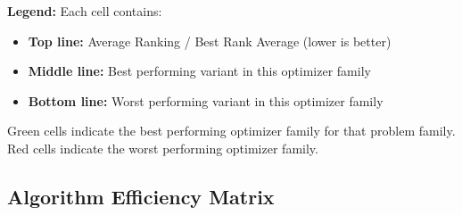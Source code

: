 \documentclass[10pt]{article}
\begin{document}
\vspace{0.5em}
\textbf{Legend:} Each cell contains:
\begin{itemize}
\item \textbf{Top line:} Average Ranking / Best Rank Average (lower is better)
\item \textbf{Middle line:} Best performing variant in this optimizer family
\item \textbf{Bottom line:} Worst performing variant in this optimizer family
\end{itemize}
Green cells indicate the best performing optimizer family for that problem family.
Red cells indicate the worst performing optimizer family.

\subsection{Algorithm Efficiency Matrix}
\end{document}
